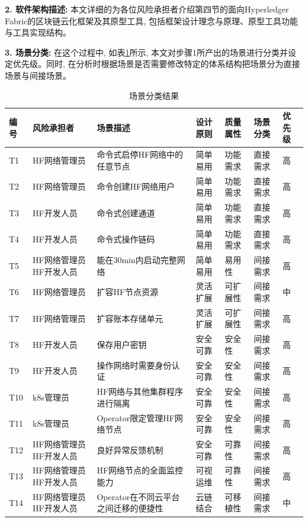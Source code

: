 \textbf{2. 软件架构描述: }本文详细的为各位风险承担者介绍第四节的面向Hyperledger Fabric的区块链云化框架及其原型工具, 包括框架设计理念与原理、原型工具功能与工具实现结构。

\textbf{3. 场景分类: }在这个过程中, 如表\ref{saam_step3}所示, 本文对步骤1所产出的场景进行分类并设定优先级。同时, 在分析时根据场景是否需要修改特定的体系结构把场景分为直接场景与间接场景。

{\footnotesize
\begin{longtable}[h]{m{20pt} m{60pt} m{90pt} m{40pt} m{40pt} m{40pt} m{30pt}}
    \caption[场景分类结果]{场景分类结果} \label{saam_step3}\\
        \hline  
        编号&风险承担者&场景描述&设计原则 & 质量属性 & 场景分类 & 优先级\\
        \hline
        T1&  HF网络管理员 & 命令式启停HF网络中的任意节点 & 简单易用  & 功能需求 & 直接需求 &  高 \\
        \hline
        T2&  HF网络管理员 & 命令创建HF网络用户 & 简单易用 & 功能需求 & 直接需求 &  高 \\
        \hline
        T3&  HF开发人员 & 命令式创建通道 & 简单易用 & 功能需求 & 直接需求 &  高 \\
        \hline
        T4&  HF开发人员 & 命令式操作链码 & 简单易用 & 功能需求 & 直接需求 &  高 \\
        \hline
        T5&  HF网络管理员 \newline HF开发人员 & 能在30min内启动完整网络 & 简单易用 & 易用性 & 间接需求 &  高 \\
        \hline
        T6&  HF网络管理员 & 扩容HF节点资源 & 灵活扩展 & 可扩展性 & 间接需求 &  中 \\
        \hline
        T7&  HF网络管理员 & 扩容账本存储单元 & 灵活扩展 & 可扩展性 & 间接需求 &  高 \\
        \hline
        T8&  HF开发人员 & 保存用户密钥 & 安全可靠 & 安全性 & 间接需求 &  高 \\
        \hline
        T9&  HF开发人员 & 操作网络时需要身份认证 & 安全可靠 & 安全性 & 间接需求 &  高 \\
        \hline    
        T10&  k8s管理员 & HF网络与其他集群程序进行隔离 & 安全可靠 & 安全性 & 间接需求 &  高 \\
        \hline
        T11&  k8s管理员 & Operator限定管理HF网络节点 & 安全可靠 & 安全性 & 间接需求 &  高 \\
        \hline
        T12&  HF网络管理员 \newline HF开发人员 & 良好异常反馈机制 & 安全可靠 & 可靠性 & 间接需求 &  高 \\
        \hline
        T13&  HF网络管理员 \newline HF开发人员 & HF网络节点的全面监控能力 & 可视运维 & 可靠性 & 间接需求 &  高 \\
        \hline
        T14&  HF网络管理员 \newline HF开发人员 & Operator在不同云平台之间迁移的便捷性 & 云链结合 & 可移植性 & 间接需求 &  中 \\
        \hline
    \end{longtable} 
}

